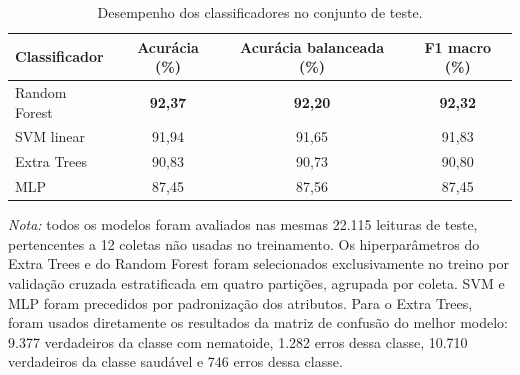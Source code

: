 \begin{table}[H]
    \centering
    \caption{Desempenho dos classificadores no conjunto de teste.}
    \label{tab:comparacao_classificadores_classicos}
    \footnotesize
    \begin{tabular}{lccc}
        \hline
        \textbf{Classificador} & \textbf{Acurácia (\%)} &
        \textbf{Acurácia balanceada (\%)} & \textbf{F1 macro (\%)} \\
        \hline
        Random Forest & \textbf{92,37} & \textbf{92,20} & \textbf{92,32} \\
        SVM linear & 91,94 & 91,65 & 91,83 \\
        Extra Trees & 90,83 & 90,73 & 90,80 \\
        MLP & 87,45 & 87,56 & 87,45 \\
        \hline
    \end{tabular}
    \vspace{0.15cm}
    \parbox{0.96\textwidth}{\footnotesize\textit{Nota:} todos os modelos foram
    avaliados nas mesmas 22.115 leituras de teste, pertencentes a 12 coletas não
    usadas no treinamento. Os hiperparâmetros do Extra Trees e do Random Forest
    foram selecionados exclusivamente no treino por validação cruzada estratificada
    em quatro partições, agrupada por coleta. SVM e MLP foram precedidos por
    padronização dos atributos. Para o Extra Trees, foram usados diretamente os
    resultados da matriz de confusão do melhor modelo: 9.377 verdadeiros da classe
    com nematoide, 1.282 erros dessa classe, 10.710 verdadeiros da classe saudável
    e 746 erros dessa classe.}
\end{table}
